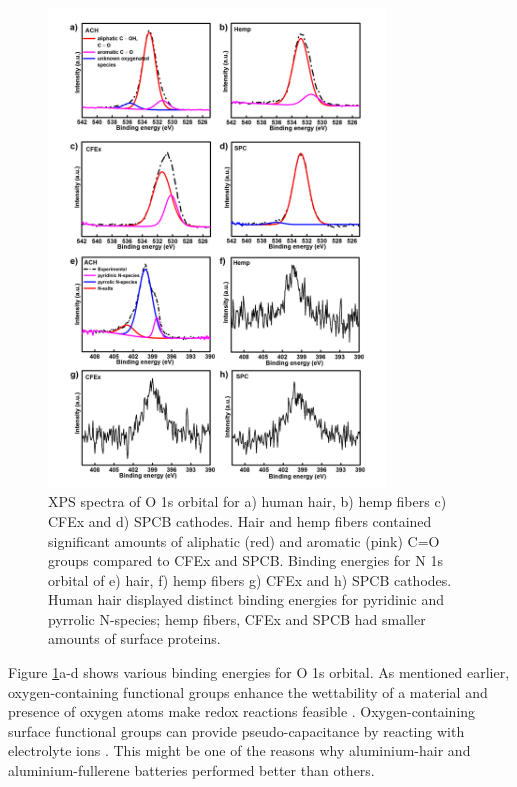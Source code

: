 \documentclass{article}
\begin{document}
\begin{figure}[tbh!]
  \centering
  \includegraphics[width=0.8\textwidth]{figures/XPSON}
    \caption{XPS spectra of O 1s orbital for a) human hair, b) hemp fibers c) CFEx and d) SPCB cathodes. Hair and hemp fibers contained significant amounts of aliphatic (red) and aromatic (pink) C=O groups  compared to CFEx and SPCB. Binding energies for N 1s orbital of e) hair, f) hemp fibers g) CFEx and h) SPCB cathodes. Human hair displayed distinct binding energies for pyridinic and pyrrolic N-species; hemp fibers, CFEx and SPCB had smaller amounts of surface proteins.}
  \label{figures:XPSON}
\end{figure}

Figure \ref{figures:XPSON}a-d shows various binding energies for O 1s orbital. As mentioned earlier, oxygen-containing functional groups enhance the wettability of a material and presence of oxygen atoms make redox reactions feasible \cite{li_effect_2011, oh_oxygen}. Oxygen-containing surface functional groups can provide pseudo-capacitance by reacting with electrolyte ions \cite{bleda_martinez}. This might be one of the reasons why aluminium-hair and aluminium-fullerene batteries performed better than others. 
\end{document}
